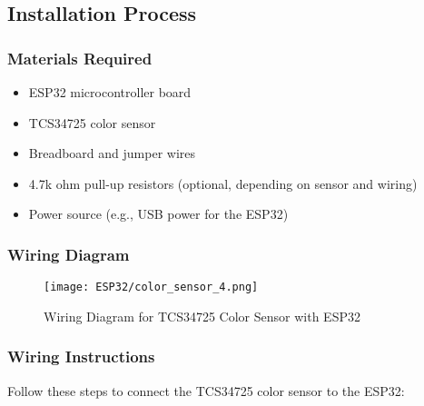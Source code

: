 \subsection*{Installation Process}

\subsubsection*{Materials Required}
\begin{itemize}
	\item ESP32 microcontroller board
	\item TCS34725 color sensor
	\item Breadboard and jumper wires
	\item 4.7k ohm pull-up resistors (optional, depending on sensor and wiring)
	\item Power source (e.g., USB power for the ESP32)
\end{itemize}

\subsubsection*{Wiring Diagram}
\begin{figure}[h]
	\centering
		\texttt{[image: ESP32/color\_sensor\_4.png]}
	\caption{Wiring Diagram for TCS34725 Color Sensor with ESP32}
	\label{fig:wiring}
\end{figure}

\subsubsection*{Wiring Instructions}
Follow these steps to connect the TCS34725 color sensor to the ESP32:

